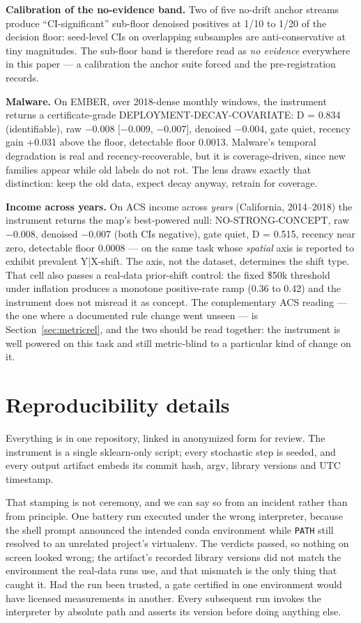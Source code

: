 \documentclass[10pt]{article} %
\begin{document}
\textbf{Calibration of the no-evidence band.} Two of five no-drift anchor streams produce
``CI-significant'' sub-floor denoised positives at 1/10 to 1/20 of the decision floor: seed-level CIs
on overlapping subsamples are anti-conservative at tiny magnitudes. The sub-floor band is therefore
read as \emph{no evidence} everywhere in this paper --- a calibration the anchor suite forced and the
pre-registration records.

\textbf{Malware.} On EMBER, over 2018-dense monthly windows, the instrument returns a
certificate-grade DEPLOYMENT-DECAY-COVARIATE: D = 0.834 (identifiable), raw $-0.008$ [$-0.009$,
$-0.007$], denoised $-0.004$, gate quiet, recency gain +0.031 above the floor, detectable floor 0.0013.
Malware's temporal degradation is real and recency-recoverable, but it is coverage-driven, since new
families appear while old labels do not rot. The lens draws exactly that distinction: keep the old
data, expect decay anyway, retrain for coverage.

\textbf{Income across years.} On ACS income across \emph{years} (California, 2014--2018) the instrument returns the map's best-powered null: NO-STRONG-CONCEPT, raw $-0.008$,
denoised $-0.007$ (both CIs negative), gate quiet, D = 0.515, recency near zero, detectable floor
0.0008 --- on the same task whose \emph{spatial} axis is reported to exhibit prevalent Y|X-shift. The
axis, not the dataset, determines the shift type. That cell also passes a real-data prior-shift
control: the fixed \$50k threshold under inflation produces a monotone positive-rate ramp (0.36 to
0.42) and the instrument does not misread it as concept. The complementary ACS reading --- the one
where a documented rule change went unseen --- is Section~\ref{sec:metricrel}, and the two should be read together: the
instrument is well powered on this task and still metric-blind to a particular kind of change on it.

\section{Reproducibility details}\label{app:repro}

Everything is in one repository, linked in anonymized form for review. The instrument is a single
sklearn-only script; every stochastic step is seeded, and every output artifact embeds its commit
hash, argv, library versions and UTC timestamp.

That stamping is not ceremony, and we can say so from an incident rather than from principle. One
battery run executed under the wrong interpreter, because the shell prompt announced the intended
conda environment while \texttt{PATH} still resolved to an unrelated project's virtualenv. The verdicts
passed, so nothing on screen looked wrong; the artifact's recorded library versions did not match
the environment the real-data runs use, and that mismatch is the only thing that caught it. Had the
run been trusted, a gate certified in one environment would have licensed measurements in another.
Every subsequent run invokes the interpreter by absolute path and asserts its version before doing
anything else.
\end{document}
